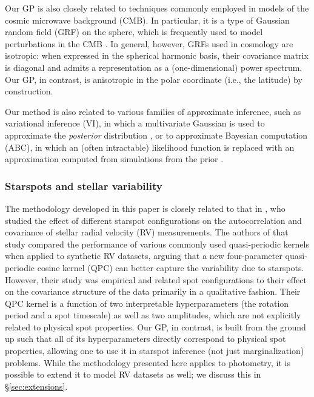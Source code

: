 \documentclass[modern,linenumbers]{aastex62}
\begin{document}
Our GP is also closely related to techniques commonly employed in models
of the cosmic microwave background (CMB). In particular, it is a type of
Gaussian random field (GRF) on the sphere, which is frequently used to
model perturbations in the CMB \citep{Wandelt2012}. In general, however,
GRFs used in cosmology are isotropic: when expressed in the spherical
harmonic basis, their covariance matrix is diagonal and admits a
representation as a (one-dimensional) power spectrum. Our GP, in contrast,
is anisotropic in
the polar coordinate (i.e., the latitude) by construction.

Our method is also related to various families of approximate inference, such as
variational inference (VI), in which a multivariate Gaussian is used to
approximate the \emph{posterior} distribution \citep[e.g,][]{Blei2016},
or to approximate Bayesian
computation (ABC), in which an (often intractable) likelihood function is
replaced with an approximation computed from simulations from the prior
\citep[e.g.,][]{Beaumont2019}.

\subsubsection{Starspots and stellar variability}

The methodology developed in this paper is closely related to that in
\citet{Perger2020}, who studied the effect of different starspot
configurations on the autocorrelation and covariance of stellar
radial velocity (RV) measurements. The authors of that study compared the
performance of various commonly used quasi-periodic kernels when applied
to synthetic RV datasets, arguing that a new four-parameter quasi-periodic
cosine kernel (QPC) can better capture the variability due to starspots.
However, their study was empirical and related spot configurations to their
effect on the covariance structure of the data primarily in a qualitative
fashion. Their QPC kernel is a function of two interpretable hyperparameters
(the rotation period and a spot timescale) as well as two amplitudes, which
are not explicitly related to physical spot properties. Our GP, in contrast,
is built from the ground up such that all of its hyperparameters directly
correspond to physical spot properties, allowing one to use it in starspot
inference (not just marginalization) problems. While the methodology presented
here applies to photometry, it is possible to extend it to model RV
datasets as well; we discuss this in \S\ref{sec:extensions}.
\end{document}

